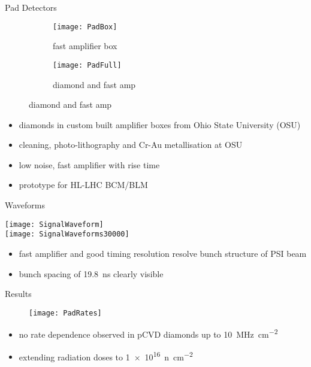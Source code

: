 \begin{frame}{Pad Detectors}

	\begin{figure}[h] 
		\centering
		\begin{subfigure}{0.45\textwidth}  
			\centering
			\texttt{[image: PadBox]}
			\caption{fast amplifier box}
		\end{subfigure}
		\begin{subfigure}{0.45\textwidth} 
			\centering
			\texttt{[image: PadFull]}
			\caption{diamond and fast amp} 	
		\end{subfigure} 
	\end{figure}
	\vspace*{-10pt}
	
	\begin{itemize}
		\itemfill
		\item diamonds in custom built amplifier boxes from Ohio State University (OSU)
		\item cleaning, photo-lithography and Cr-Au metallisation at OSU
		\item low noise, fast amplifier with  rise time
		\item prototype for HL-LHC BCM/BLM
	\end{itemize}
	
\end{frame}
\begin{frame}{Waveforms}
	\vspace*{-20pt}
	\begin{center}
		\texttt{[image: SignalWaveform]}\\
		\texttt{[image: SignalWaveforms30000]}
	\end{center}
	\begin{itemize}
		\item fast amplifier and good timing resolution \ra resolve bunch structure of PSI beam
		\item bunch spacing of \SI{19.8}{ns} clearly visible
	\end{itemize}
\end{frame}
\begin{frame}{Results}

	\vspace*{-5pt}
	\begin{figure}[h]
		\begin{center}
			\texttt{[image: PadRates]}
		\end{center}
	\end{figure}

	\begin{itemize}
		\item no rate dependence observed in pCVD diamonds up to \SI{10}{\mega\hertz\per cm^2}
		\item extending radiation doses to \SI{1e16}{n\per cm^2}
	\end{itemize}
\end{frame}
